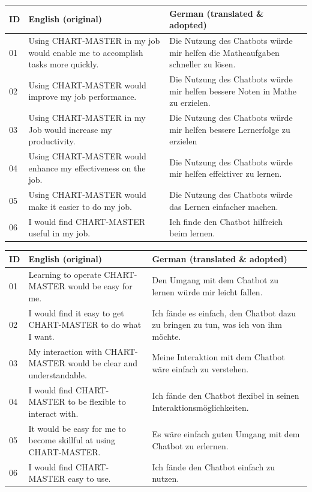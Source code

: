\begin{ctable}
    \begin{tabularx}{\textwidth}{l X X}
        \toprule
        \textbf{ID} & \textbf{English} (original) & \textbf{German} (translated \& adopted) \\
        \midrule
        01 & Using CHART-MASTER in my job would enable me to accomplish tasks more quickly. & Die Nutzung des Chatbots würde mir helfen die Matheaufgaben schneller zu lösen. \\
        02 & Using CHART-MASTER would improve my job performance. & Die Nutzung des Chatbots würde mir helfen bessere Noten in Mathe zu erzielen. \\
        03 & Using CHART-MASTER in my Job would increase my productivity. & Die Nutzung des Chatbots würde mir helfen bessere Lernerfolge zu erzielen \\
        04 & Using CHART-MASTER would enhance my effectiveness on the job. & Die Nutzung des Chatbots würde mir helfen effektiver zu lernen. \\
        05 & Using CHART-MASTER would make it easier to do my job. & Die Nutzung des Chatbots würde das Lernen einfacher machen. \\
        06 & I would find CHART-MASTER useful in my job. & Ich finde den Chatbot hilfreich beim lernen. \\
        \bottomrule
    \end{tabularx}
\end{ctable}

\begin{ctable}
    \begin{tabularx}{\textwidth}{l X X}
        \toprule
        \textbf{ID} & \textbf{English} (original) & \textbf{German} (translated \& adopted) \\
        \midrule
        01 & Learning to operate CHART-MASTER would be easy for me. & Den Umgang mit dem Chatbot zu lernen würde mir leicht fallen. \\
        02 & I would find it easy to get CHART-MASTER to do what I want. & Ich fände es einfach, den Chatbot dazu zu bringen zu tun, was ich von ihm möchte. \\
        03 & My interaction with CHART-MASTER would be clear and understandable. & Meine Interaktion mit dem Chatbot wäre einfach zu verstehen. \\
        04 & I would find CHART-MASTER to be flexible to interact with. & Ich fände den Chatbot flexibel in seinen Interaktionsmöglichkeiten. \\
        05 & It would be easy for me to become skillful at using CHART-MASTER. & Es wäre einfach guten Umgang mit dem Chatbot zu erlernen. \\
        06 & I would find CHART-MASTER easy to use. & Ich fände den Chatbot einfach zu nutzen. \\
        \bottomrule
    \end{tabularx}
\end{ctable}

